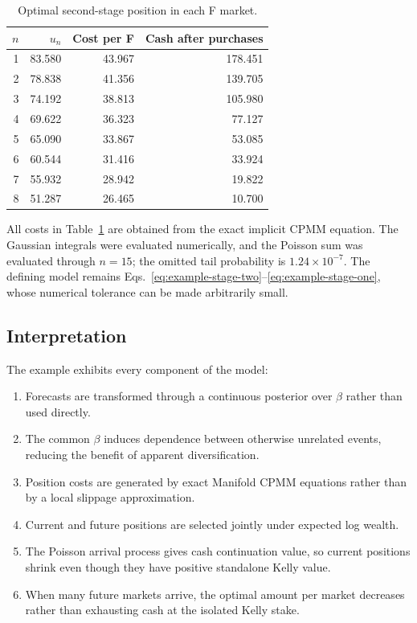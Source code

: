 \documentclass[journal, a4paper]{IEEEtran}
\begin{document}
\begin{table}[!t]
\centering
\caption{Optimal second-stage position in each F market.}
\label{tab:future-policy}
\begin{tabular}{@{}rrrr@{}}
\toprule
$n$ & $u_n$ & Cost per F & Cash after purchases\\
\midrule
1 & 83.580 & 43.967 & 178.451\\
2 & 78.838 & 41.356 & 139.705\\
3 & 74.192 & 38.813 & 105.980\\
4 & 69.622 & 36.323 & 77.127\\
5 & 65.090 & 33.867 & 53.085\\
6 & 60.544 & 31.416 & 33.924\\
7 & 55.932 & 28.942 & 19.822\\
8 & 51.287 & 26.465 & 10.700\\
\bottomrule
\end{tabular}
\end{table}

All costs in Table~\ref{tab:future-policy} are obtained from the exact implicit CPMM equation. The Gaussian integrals were evaluated numerically, and the Poisson sum was evaluated through $n=15$; the omitted tail probability is $1.24\times10^{-7}$. The defining model remains Eqs.~\eqref{eq:example-stage-two}--\eqref{eq:example-stage-one}, whose numerical tolerance can be made arbitrarily small.

\subsection{Interpretation}
The example exhibits every component of the model:
\begin{enumerate}
\item Forecasts are transformed through a continuous posterior over $\beta$ rather than used directly.
\item The common $\beta$ induces dependence between otherwise unrelated events, reducing the benefit of apparent diversification.
\item Position costs are generated by exact Manifold CPMM equations rather than by a local slippage approximation.
\item Current and future positions are selected jointly under expected log wealth.
\item The Poisson arrival process gives cash continuation value, so current positions shrink even though they have positive standalone Kelly value.
\item When many future markets arrive, the optimal amount per market decreases rather than exhausting cash at the isolated Kelly stake.
\end{enumerate}
\end{document}
